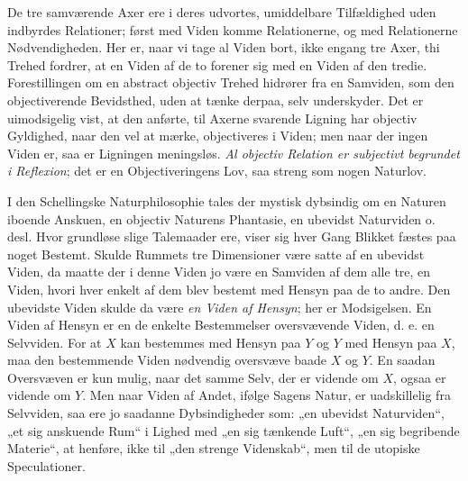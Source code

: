 \documentclass[12pt,a4paper]{book}
\begin{document}
De tre samværende Axer ere i deres udvortes, umiddelbare Tilfældighed
uden indbyrdes Relationer; først med Viden komme Relationerne, og med
Relationerne Nødvendigheden. Her er, naar vi tage al Viden bort, ikke
engang tre Axer, thi Trehed fordrer, at en Viden af de to forener sig
med en Viden af den tredie. Forestillingen om en abstract objectiv
Trehed hidrører fra en Samviden, som den objectiverende Bevidsthed,
uden at tænke derpaa, selv underskyder. Det er uimodsigelig vist, at
den anførte, til Axerne
svarende Ligning har objectiv Gyldighed, naar den vel at mærke,
objectiveres i Viden; men naar der ingen Viden er, saa er Ligningen
meningsløs. \emph{Al objectiv Relation er subjectivt begrundet i
Reflexion}; det er en Objectiveringens Lov, saa streng som nogen
Naturlov.

I den Schellingske Naturphilosophie tales der mystisk dybsindig om en
Naturen iboende Anskuen, en objectiv Naturens Phantasie, en ubevidst
Naturviden o. desl. Hvor grundløse slige Talemaader ere, viser sig
hver Gang Blikket fæstes paa noget Bestemt. Skulde Rummets tre
Dimensioner være satte af en ubevidst Viden, da maatte der i denne
Viden jo være en Samviden af dem alle tre, en Viden, hvori hver enkelt
af dem blev bestemt med Hensyn paa de to andre. Den ubevidste Viden
skulde da være \emph{en Viden af Hensyn}; her er Modsigelsen. En Viden
af Hensyn er en de enkelte Bestemmelser oversvævende Viden, d. e. en
Selvviden. For at $X$ kan bestemmes med Hensyn paa $Y$ og $Y$ med
Hensyn paa $X$, maa den bestemmende Viden nødvendig oversvæve baade
$X$ og $Y$. En saadan Oversvæven er kun mulig, naar det samme Selv,
der er vidende om $X$, ogsaa er vidende om $Y$. Men naar Viden af
Andet, ifølge Sagens Natur, er uadskillelig fra Selvviden, saa ere jo
saadanne Dybsindigheder som: „en ubevidst Naturviden“, „et sig
anskuende Rum“ i Lighed med „en sig tænkende Luft“, „en sig begribende
Materie“, at henføre, ikke til „den strenge Videnskab“, men til de
utopiske Speculationer.
\end{document}
